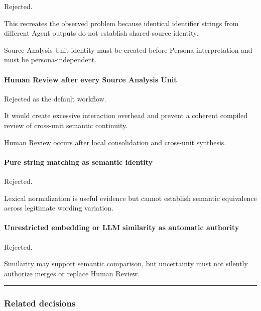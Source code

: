 Rejected.

This recreates the observed problem because identical identifier strings from different Agent outputs do not establish shared source identity.

Source Analysis Unit identity must be created before Persona interpretation and must be persona-independent.

\hypertarget{human-review-after-every-source-analysis-unit}{%
\paragraph{Human Review after every Source Analysis Unit}\label{human-review-after-every-source-analysis-unit}}

Rejected as the default workflow.

It would create excessive interaction overhead and prevent a coherent compiled review of cross-unit semantic continuity.

Human Review occurs after local consolidation and cross-unit synthesis.

\hypertarget{pure-string-matching-as-semantic-identity}{%
\paragraph{Pure string matching as semantic identity}\label{pure-string-matching-as-semantic-identity}}

Rejected.

Lexical normalization is useful evidence but cannot establish semantic equivalence across legitimate wording variation.

\hypertarget{unrestricted-embedding-or-llm-similarity-as-automatic-authority}{%
\paragraph{Unrestricted embedding or LLM similarity as automatic authority}\label{unrestricted-embedding-or-llm-similarity-as-automatic-authority}}

Rejected.

Similarity may support semantic comparison, but uncertainty must not silently authorize merges or replace Human Review.

\begin{center}\rule{0.5\linewidth}{0.5pt}\end{center}

\hypertarget{related-decisions-2}{%
\subsubsection{Related decisions}\label{related-decisions-2}}

